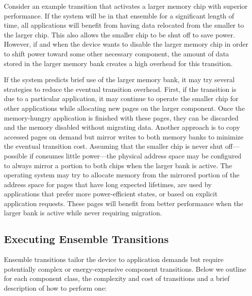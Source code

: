 Consider an example transition that activates a larger memory chip with
superior performance. If the system will be in that ensemble for a
significant length of time, all applications will benefit from having data
relocated from the smaller to the larger chip. This also allows the smaller
chip to be shut off to save power. However, if and when the device wants to
disable the larger memory chip in order to shift power toward some other
necessary component, the amount of data stored in the larger memory bank
creates a high overhead for this transition.

If the system predicts brief use of the larger memory bank, it may try
several strategies to reduce the eventual transition overhead. First, if the
transition is due to a particular application, it may continue to operate the
smaller chip for other applications while allocating new pages on the larger
component. Once the memory-hungry application is finished with these pages,
they can be discarded and the memory disabled without migrating data. Another
approach is to copy accessed pages on demand but mirror writes to both memory
banks to minimize the eventual transition cost. Assuming that the smaller
chip is never shut off---possible if consumes little power---the physical
address space may be configured to always mirror a portion to both chips when
the larger bank is active. The operating system may try to allocate memory
from the mirrored portion of the address space for pages that have long
expected lifetimes, are used by applications that prefer more power-efficient
states, or based on explicit application requests. These pages will benefit
from better performance when the larger bank is active while never requiring
migration.

\subsection{Executing Ensemble Transitions}
\label{subsec-execute}

Ensemble transitions tailor the device to application demands but require
potentially complex or energy-expensive component transitions. Below we
outline for each component class, the complexity and cost of transitions and
a brief description of how to perform one:

